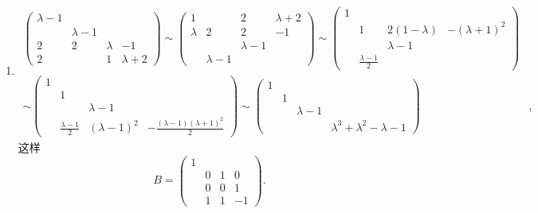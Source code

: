 \begin{enumerate}
    \item[\textbf{解答:}]
    \begin{align*}\begin{pmatrix}
        \lambda-1& & & \\ &\lambda-1& & \\2&2&\lambda&-1\\2& &1&\lambda+2
    \end{pmatrix}\sim
    \begin{pmatrix}
        1& &2&\lambda+2\\\lambda&2&2&-1\\ & &\lambda-1& \\ &\lambda-1& & 
    \end{pmatrix}\sim
    \begin{pmatrix}
        1& & & \\&1&2(1-\lambda)&-(\lambda+1)^2\\ & &\lambda-1& \\ &\frac{\lambda-1}{2}& & 
    \end{pmatrix}&\\ \sim
    \begin{pmatrix}
        1& & & \\&1& & \\ & &\lambda-1& \\ &\frac{\lambda-1}{2}&(\lambda-1)^2&-\frac{(\lambda-1)(\lambda+1)^2}{2} 
    \end{pmatrix}\sim
    \begin{pmatrix}
        1& & & \\&1& & \\ & &\lambda-1& \\ & & &\lambda^3+\lambda^2-\lambda-1
    \end{pmatrix}&,\end{align*}这样
    $$B=\begin{pmatrix}
        1& & & \\ &0&1&0\\ &0&0&1\\ &1&1&-1
    \end{pmatrix}.$$


\end{enumerate}
